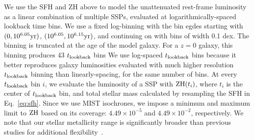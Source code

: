 We use the SFH and ZH above to model the unattenuated rest-frame luminosity as
a linear combination of multiple SSPs, evaluated at logarithmically-spaced
lookback time bins.
We use a fixed log-binning with the bin egdes starting with $(0, 10^{6.05}{\rm
yr})$, $(10^{6.05}, 10^{6.15}{\rm yr})$, and continuing on with bins of width
0.1 dex.
The binning is truncated at the age of the model galaxy. 
For a $z=0$ galaxy, this binning produces 43 $t_{\rm lookback}$ bins
We use log-spaced $t_{\rm lookback}$ bins because it better reproduces galaxy luminosities
evaluated with much higher resolution $t_{\rm lookback}$ binning than linearly-spacing, for
the same number of bins. 
At every $t_{\rm lookback}$ bin $i$, we evaluate the luminosity of a SSP with ${\rm
ZH}(t_i)$, where $t_i$ is the center of $t_{\rm lookback}$ bin, and total stellar mass
calculated by resampling the SFH in Eq.~\ref{eq:sfh}. 
Since we use MIST isochrones, we impose a minimum and maximum limit to ${\rm
ZH}$ based on its coverage: $4.49\times10^{-5}$ and $4.49\times10^{-2}$,
respectively.
We note that our stellar metallicity range is significantly broader than
previous studies for additional flexibility~\citep[\emph{e.g.}][]{carnall2017,
leja2017, tacchella2021}. 

